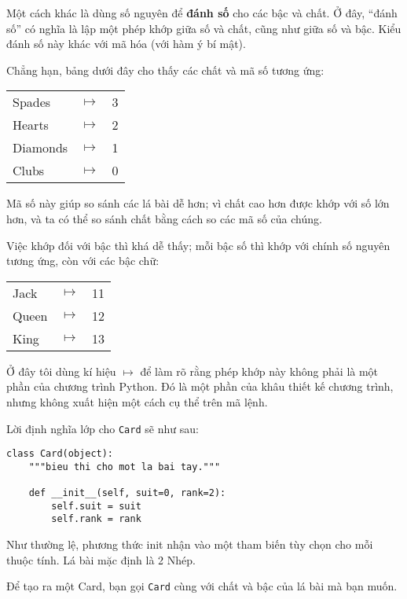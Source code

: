 \documentclass[11pt]{book}
\begin{document}

Một cách khác là dùng số nguyên để {\bf đánh số} cho các bậc và chất.
Ở đây, ``đánh số'' có nghĩa là lập một phép khớp giữa số và chất, cũng như
giữa số và bậc. Kiểu đánh số này khác với mã hóa (với hàm ý bí mật).

Chẳng hạn, bảng dưới đây cho thấy các chất và mã số tương ứng:

\beforefig
\begin{tabular}{l c l}
Spades & $\mapsto$ & 3 \\
Hearts & $\mapsto$ & 2 \\
Diamonds & $\mapsto$ & 1 \\
Clubs & $\mapsto$ & 0
\end{tabular}
\afterfig

Mã số này giúp so sánh các lá bài dễ hơn; vì chất cao hơn được khớp với
số lớn hơn, và ta có thể so sánh chất bằng cách so các mã số của chúng.

Việc khớp đối với bậc thì khá dễ thấy; mỗi bậc số thì khớp với chính số
nguyên tương ứng, còn với các bậc chữ:

\beforefig
\begin{tabular}{l c l}
Jack & $\mapsto$ & 11 \\
Queen & $\mapsto$ & 12 \\
King & $\mapsto$ & 13 \\
\end{tabular}
\afterfig

Ở đây tôi dùng kí hiệu $\mapsto$ để làm rõ rằng phép khớp này không phải là
một phần của chương trình Python. Đó là một phần của khâu thiết kế chương trình,
nhưng không xuất hiện một cách cụ thể trên mã lệnh.


Lời định nghĩa lớp cho {\tt Card} sẽ như sau:

\beforeverb
\begin{verbatim}
class Card(object):
    """bieu thi cho mot la bai tay."""

    def __init__(self, suit=0, rank=2):
        self.suit = suit
        self.rank = rank
\end{verbatim}
\afterverb
%
Như thường lệ, phương thức init nhận vào một 
tham biến tùy chọn cho mỗi thuộc tính. Lá bài mặc định
là 2 Nhép.


Để tạo ra một Card, bạn gọi {\tt Card} cùng với
chất và bậc của lá bài mà bạn muốn.
\end{document}
